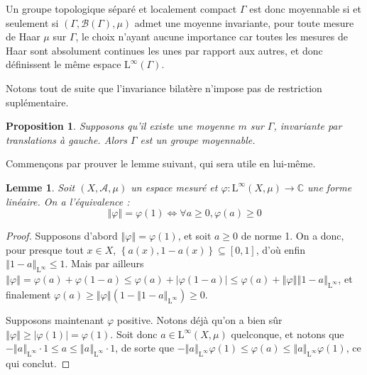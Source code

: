 \documentclass[a4paper,12pt]{article}
\newtheorem{proposition}[theorem]{Proposition}
\newtheorem{lemma}[theorem]{Lemme}
\newcommand{\C}{\mathbb{C}}
\newcommand{\Bor}{\mathcal{B}}
\newcommand{\norm}[1]{\left\Vert #1\right\Vert}
\newcommand{\abs}[1]{\left\vert#1\right\vert}
\newcommand{\set}[1]{\left\{ #1 \right\}}
\newcommand{\ssi}{si et seulement si }
\renewcommand{\iff}{\Leftrightarrow}
\begin{document}
Un groupe topologique séparé et localement compact $\Gamma$ est donc moyennable \ssi $(\Gamma, \Bor(\Gamma), \mu)$ admet une 
moyenne invariante, pour toute mesure de Haar $\mu$ sur $\Gamma$, le choix n'ayant aucune importance car toutes les mesures 
de Haar sont absolument continues les unes par rapport aux autres, et donc définissent le même espace $\mathrm{L}^\infty(\Gamma)$.

Notons tout de suite que l'invariance bilatère n'impose pas de restriction suplémentaire. 
\begin{proposition}\label{bilateral_of_left}
    Supposons qu'il existe une moyenne $m$ sur $\Gamma$, invariante par translations \emph{à gauche}.
    Alors $\Gamma$ est un groupe moyennable.
\end{proposition} 

Commençons par prouver le lemme suivant, qui sera utile en lui-même.

\begin{lemma}\label{positive_iff_norm}
    Soit $(X, \mathcal{A}, \mu)$ un espace mesuré et $\varphi:\mathrm{L}^\infty(X,\mu)\to\C$ une forme linéaire. 
    On a l'équivalence :
    \begin{equation*}
        \norm{\varphi} = \varphi(1) \iff \forall a \ge 0, \varphi(a) \geq 0
    \end{equation*}
\end{lemma}

\begin{proof}
    Supposons d'abord $\norm{\varphi} = \varphi(1)$, et soit $a\ge 0$ de norme 1. On a donc, pour presque tout $x\in X$, $\set{a(x), 1-a(x)}\subseteq[0,1]$,
    d'où enfin $\norm{1-a}_{\mathrm{L}^\infty}\le 1$. Mais par ailleurs $\norm{\varphi} = \varphi(a) + \varphi(1-a) \le \varphi(a) + \abs{\varphi(1-a)} \le \varphi(a) + \norm{\varphi}\norm{1 - a}_{\mathrm{L}^\infty}$, et finalement
    $\varphi(a)\ge \norm{\varphi}(1 - \norm{1-a}_{\mathrm{L}^\infty}) \ge0$. 

    Supposons maintenant $\varphi$ positive. Notons déjà qu'on a bien sûr $\norm{\varphi}\ge\abs{\varphi(1)}=\varphi(1)$. Soit donc $a\in\mathrm{L}^\infty(X,\mu)$ quelconque,
    et notons que $-\norm{a}_{\mathrm{L}^\infty}\cdot1\le a\le\norm{a}_{\mathrm{L}^\infty}\cdot1$, de sorte que $-\norm{a}_{\mathrm{L}^\infty}\varphi(1)\le\varphi(a)\le\norm{a}_{\mathrm{L}^\infty}\varphi(1)$, ce qui conclut.
\end{proof}
\end{document}
